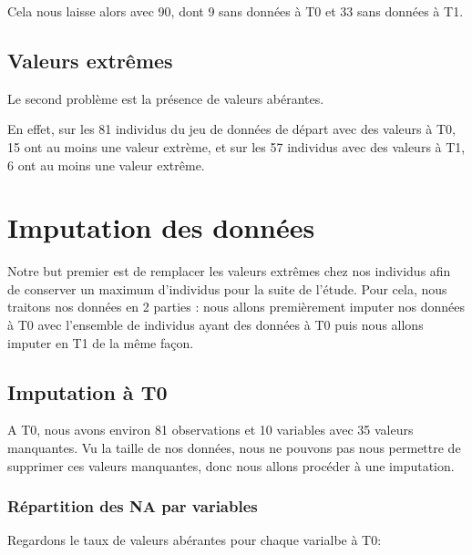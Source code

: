 \documentclass[]{article}
\begin{document}
Cela nous laisse alors avec 90, dont 9 sans données à T0 et 33 sans
données à T1.

\hypertarget{valeurs-extruxeames}{%
\subsection{Valeurs extrêmes}\label{valeurs-extruxeames}}

Le second problème est la présence de valeurs abérantes.

En effet, sur les 81 individus du jeu de données de départ avec des
valeurs à T0, 15 ont au moins une valeur extrème, et sur les 57
individus avec des valeurs à T1, 6 ont au moins une valeur extrême.

\hypertarget{imputation-des-donnuxe9es}{%
\section{Imputation des données}\label{imputation-des-donnuxe9es}}

Notre but premier est de remplacer les valeurs extrêmes chez nos
individus afin de conserver un maximum d'individus pour la suite de
l'étude. Pour cela, nous traitons nos données en 2 parties : nous allons
premièrement imputer nos données à T0 avec l'ensemble de individus ayant
des données à T0 puis nous allons imputer en T1 de la même façon.

\hypertarget{imputation-uxe0-t0}{%
\subsection{Imputation à T0}\label{imputation-uxe0-t0}}

A T0, nous avons environ 81 observations et 10 variables avec 35 valeurs
manquantes. Vu la taille de nos données, nous ne pouvons pas nous
permettre de supprimer ces valeurs manquantes, donc nous allons procéder
à une imputation.

\hypertarget{ruxe9partition-des-na-par-variables}{%
\subsubsection{Répartition des NA par
variables}\label{ruxe9partition-des-na-par-variables}}

Regardons le taux de valeurs abérantes pour chaque varialbe à T0:
\end{document}
